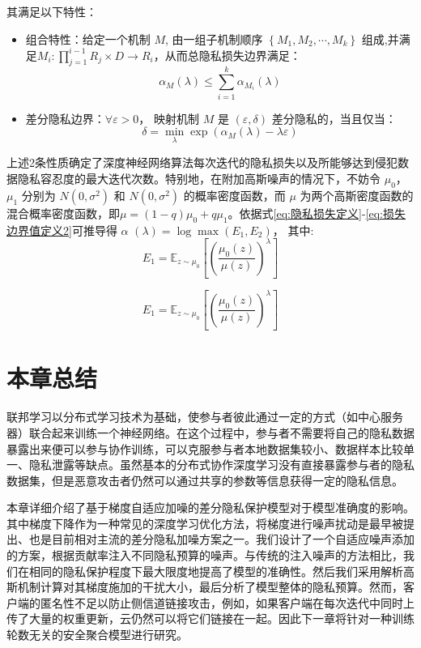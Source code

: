 其满足以下特性：

\begin{itemize}
\item 组合特性：给定一个机制 $M$, 由一组子机制顺序 $\left\{M_{1}, M_{2}, \cdots, M_{k}\right\}$ 组成,并满足$M_{i}: \prod_{j=1}^{i-1} R_{j} \times D \rightarrow R_{i}$，从而总隐私损失边界满足：
\begin{equation}\label{eq:损失边界值定义2}
\alpha_{M}(\lambda) \leqslant \sum_{i=1}^{k} \alpha_{M_{i}}(\lambda)
\end{equation}

\item 差分隐私边界：$\forall \varepsilon>0$， 映射机制 $M$ 是 $(\varepsilon,\delta)$ 差分隐私的，当且仅当：
\begin{equation}\label{eq:损失边界值定义2}
\delta=\min _{\lambda} \exp \left(\alpha_{M}(\lambda)-\lambda \varepsilon\right)
\end{equation}
\end{itemize}

上述2条性质确定了深度神经网络算法每次迭代的隐私损失以及所能够达到侵犯数据隐私容忍度的最大迭代次数。特别地，在附加高斯噪声的情况下，不妨令 $\mu_{0}$，$\mu_{1}$ 分别为 $N\left(0,\sigma^{2}\right)$ 和 $N\left(0,\sigma^{2}\right)$ 的概率密度函数，而 $\mu$ 为两个高斯密度函数的混合概率密度函数，即$\mu=(1-q) \mu_{0}+q \mu_{1}$。依据式\ref{eq:隐私损失定义}-\ref{eq:损失边界值定义2}可推导得 $\alpha$ $(\lambda)=\log \max \left(E_{1},E_{2}\right)$， 其中:
\begin{equation}\label{eq:隐私容忍1}
E_{1}=\mathbb{E}_{z \sim \mu_{0}}\left[\left(\frac{\mu_{0}(z)}{\mu(z)}\right)^{\lambda}\right]
\end{equation}

\begin{equation}\label{eq:隐私容忍2}
E_{1}=\mathbb{E}_{z \sim \mu_{0}}\left[\left(\frac{\mu_{0}(z)}{\mu(z)}\right)^{\lambda}\right]
\end{equation}

\section{本章总结}
联邦学习以分布式学习技术为基础，使参与者彼此通过一定的方式（如中心服务器）联合起来训练一个神经网络。在这个过程中，参与者不需要将自己的隐私数据暴露出来便可以参与协作训练，可以克服参与者本地数据集较小、数据样本比较单一、隐私泄露等缺点。虽然基本的分布式协作深度学习没有直接暴露参与者的隐私数据集，但是恶意攻击者仍然可以通过共享的参数等信息获得一定的隐私信息。 

本章详细介绍了基于梯度自适应加噪的差分隐私保护模型对于模型准确度的影响。其中梯度下降作为一种常见的深度学习优化方法，将梯度进行噪声扰动是最早被提出、也是目前相对主流的差分隐私加噪方案之一。我们设计了一个自适应噪声添加的方案，根据贡献率注入不同隐私预算的噪声。与传统的注入噪声的方法相比，我们在相同的隐私保护程度下最大限度地提高了模型的准确性。然后我们采用解析高斯机制计算对其梯度施加的干扰大小，最后分析了模型整体的隐私预算。然而，客户端的匿名性不足以防止侧信道链接攻击，例如，如果客户端在每次迭代中同时上传了大量的权重更新，云仍然可以将它们链接在一起。因此下一章将针对一种训练轮数无关的安全聚合模型进行研究。

